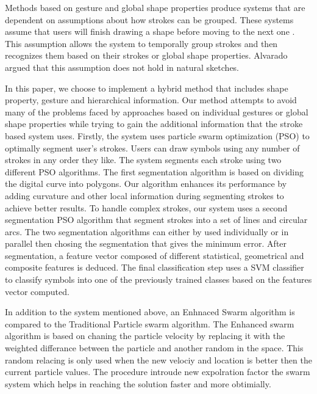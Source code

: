 \documentclass[preprint,1p,times,review]{elsarticle}
\begin{document}
 Methods based on gesture and global shape properties produce systems that are dependent on assumptions about how strokes can be grouped. These systems assume that users will finish drawing a shape before moving to the next one \cite{Cali63,geometrydomain49}. This assumption allows the system to temporally group strokes and then recognizes them based on their strokes or global shape properties. Alvarado \cite{AlvaradoDigital} argued that this assumption does not hold in natural sketches.


In this paper, we choose to implement a hybrid method that includes shape property, gesture and hierarchical information. Our method attempts to avoid many of the problems faced by approaches based on individual gestures or global shape properties while trying to gain the additional information that the stroke based system uses. Firstly, the system uses particle swarm optimization (PSO) to optimally segment user's strokes. Users can draw symbols using any number of strokes in any order they like. The system segments each stroke using two different PSO algorithms. The first segmentation algorithm is based on dividing the digital curve into polygons\cite{PolygonApproximationPSO}. Our algorithm enhances its performance by adding curvature and other local information during segmenting strokes to achieve better results. To handle complex strokes, our system uses a second segmentation PSO algorithm that segment strokes into a set of lines and circular arcs. The two segmentation algorithms can either by used individually or in parallel then chosing the segmentation that gives the minimum error. After segmentation, a feature vector composed of different statistical, geometrical and composite features is deduced. The final classification step uses a SVM classifier to classify symbols into one of the previously trained classes based on the features vector computed\cite{mypaper}.
  
  
  In addition to the system mentioned above, an Enhnaced Swarm algorithm is compared to the Traditional Particle swarm algorithm\cite{stockPaper}. The Enhanced swarm algorithm is based on chaning the particle velocity by replacing it with the weighted differance between the particle and another random in the space. This random relacing is only used when the new velociy and location is better then the current particle values. The procedure introude new expolration factor the swarm system which helps in reaching the solution faster and more obtimially.
\end{document}
